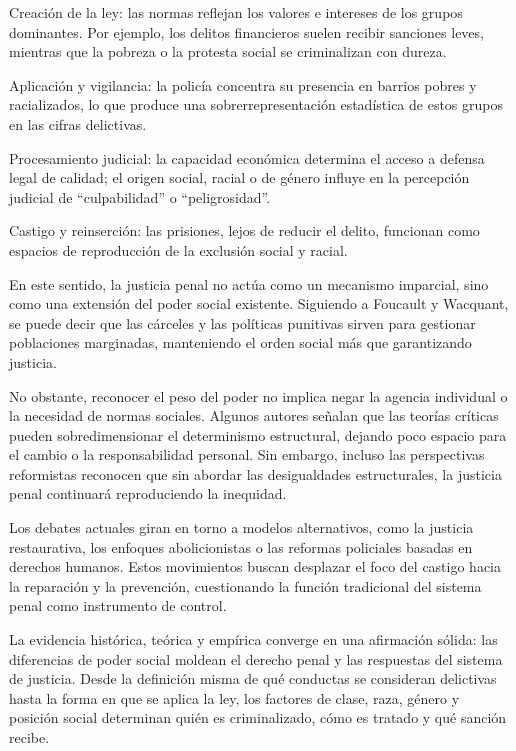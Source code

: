 \documentclass[
  spanish,
  letterpaper,
  DIV=11,
  numbers=noendperiod]{scrreprt}
\begin{document}
Creación de la ley: las normas reflejan los valores e intereses de los
grupos dominantes. Por ejemplo, los delitos financieros suelen recibir
sanciones leves, mientras que la pobreza o la protesta social se
criminalizan con dureza.

Aplicación y vigilancia: la policía concentra su presencia en barrios
pobres y racializados, lo que produce una sobrerrepresentación
estadística de estos grupos en las cifras delictivas.

Procesamiento judicial: la capacidad económica determina el acceso a
defensa legal de calidad; el origen social, racial o de género influye
en la percepción judicial de ``culpabilidad'' o ``peligrosidad''.

Castigo y reinserción: las prisiones, lejos de reducir el delito,
funcionan como espacios de reproducción de la exclusión social y racial.

En este sentido, la justicia penal no actúa como un mecanismo imparcial,
sino como una extensión del poder social existente. Siguiendo a Foucault
y Wacquant, se puede decir que las cárceles y las políticas punitivas
sirven para gestionar poblaciones marginadas, manteniendo el orden
social más que garantizando justicia.

No obstante, reconocer el peso del poder no implica negar la agencia
individual o la necesidad de normas sociales. Algunos autores señalan
que las teorías críticas pueden sobredimensionar el determinismo
estructural, dejando poco espacio para el cambio o la responsabilidad
personal. Sin embargo, incluso las perspectivas reformistas reconocen
que sin abordar las desigualdades estructurales, la justicia penal
continuará reproduciendo la inequidad.

Los debates actuales giran en torno a modelos alternativos, como la
justicia restaurativa, los enfoques abolicionistas o las reformas
policiales basadas en derechos humanos. Estos movimientos buscan
desplazar el foco del castigo hacia la reparación y la prevención,
cuestionando la función tradicional del sistema penal como instrumento
de control.

La evidencia histórica, teórica y empírica converge en una afirmación
sólida: las diferencias de poder social moldean el derecho penal y las
respuestas del sistema de justicia. Desde la definición misma de qué
conductas se consideran delictivas hasta la forma en que se aplica la
ley, los factores de clase, raza, género y posición social determinan
quién es criminalizado, cómo es tratado y qué sanción recibe.
\end{document}
